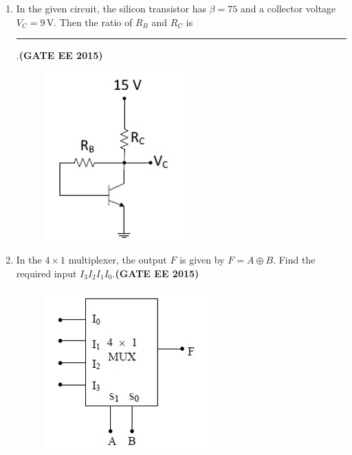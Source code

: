 \documentclass[a4paper,12pt]{exam}
\theoremstyle{remark}
\begin{document}
\begin{enumerate}
\begin{multicols}{4}
\begin{enumerate}
        \item $0$
        \item $\pi$
        \item $\pi/2$
        \item $-\pi/2$
    \end{enumerate}
\end{multicols}
\item In the given circuit, the silicon transistor has $\beta = 75$ and a collector voltage $V_C = 9\,\mathrm{V}$. Then the ratio of $R_B$ and $R_C$ is \rule{3cm}{0.15mm}.\hfill{\textbf{(GATE EE 2015)}}
\begin{figure}[H]
    \centering
    \includegraphics[width=0.4\columnwidth]{figs/Q 24.png}
    \caption{}
    \label{fig:placeholder}
\end{figure}
\item In the $4 \times 1$ multiplexer, the output $F$ is given by $F = A \oplus B$. Find the required input $I_3I_2I_1I_0$.\hfill{\textbf{(GATE EE 2015)}}
\begin{figure}[H]
    \centering
    \includegraphics[width=0.5\columnwidth]{figs/Q 25.png}
    \caption{}
    \label{fig:placeholder}
\end{figure}
\begin{multicols}{4}
    \begin{enumerate}

\end{enumerate}
\end{multicols}
\end{enumerate}
\end{document}
